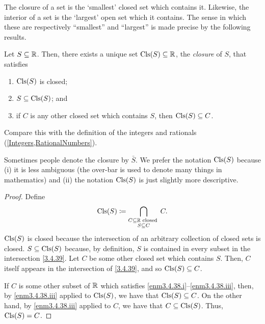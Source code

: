 The closure of a set is the `smallest' closed set which contains it.  Likewise, the interior of a set is the `largest' open set which it contains.  The sense in which these are respectively ``smallest'' and ``largest'' is made precise by the following results.
\begin{prp}[Closure]\label{prp3.4.34}
Let $S\subseteq \mathbb{R}$.  Then, there exists a unique set $\operatorname{Cls} (S)\subseteq \mathbb{R}$, the \emph{closure} of $S$, that satisfies
\begin{enumerate}
\item \label{enm3.4.38.i}$\operatorname{Cls} (S)$ is closed;
\item \label{enm3.4.38.ii}$S\subseteq \operatorname{Cls} (S)$; and
\item \label{enm3.4.38.iii}if $C$ is any other closed set which contains $S$, then $\operatorname{Cls} (S)\subseteq C$.
\end{enumerate}
\begin{rmk}
Compare this with the definition of the integers and rationals (\cref{Integers,RationalNumbers}).
\end{rmk}
\begin{rmk}
Sometimes people denote the closure by $\bar{S}$.  We prefer the notation $\operatorname{Cls} (S)$ because (i) it is less ambiguous (the over-bar is used to denote many things in mathematics) and (ii) the notation $\operatorname{Cls} (S)$ is just slightly more descriptive.
\end{rmk}
\begin{proof}
Define
\begin{equation}\label{3.4.39}
\operatorname{Cls} (S)\coloneqq \bigcap _{\substack{C\subseteq \mathbb{R} \text{ closed } \\ S\subseteq C}}C.
\end{equation}
$\operatorname{Cls} (S)$ is closed because the intersection of an arbitrary collection of closed sets is closed.  $S\subseteq \operatorname{Cls} (S)$ because, by definition, $S$ is contained in every subset in the intersection \eqref{3.4.39}.  Let $C$ be some other closed set which contains $S$.  Then, $C$ itself appears in the intersection of \eqref{3.4.39}, and so $\operatorname{Cls} (S)\subseteq C$.

If $C$ is some other subset of $\mathbb{R}$ which satisfies \ref{enm3.4.38.i}--\ref{enm3.4.38.iii}, then, by \ref{enm3.4.38.iii} applied to $\operatorname{Cls} (S)$, we have that $\operatorname{Cls} (S)\subseteq C$.  On the other hand, by \ref{enm3.4.38.iii} applied to $C$, we have that $C\subseteq \operatorname{Cls} (S)$.  Thus, $\operatorname{Cls} (S)=C$.
\end{proof}
\end{prp}

